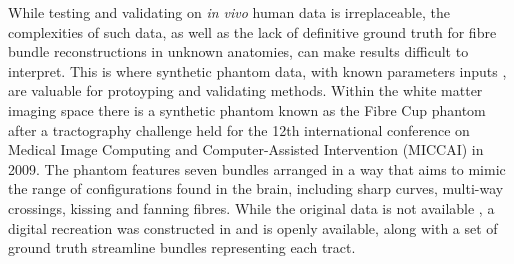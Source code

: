 
While testing and validating on \textit{in vivo} human data is irreplaceable, the complexities of such data, as well as the lack of definitive ground truth for fibre bundle reconstructions in unknown anatomies, can make results difficult to interpret.
This is where synthetic phantom data, with known parameters inputs , are valuable for protoyping and validating methods.
Within the white matter imaging space there is a synthetic phantom known as the Fibre Cup phantom after a tractography challenge held for the 12th international conference on Medical Image Computing and Computer-Assisted Intervention (MICCAI) in 2009.
The phantom features seven bundles arranged in a way that aims to mimic the range of configurations found in the brain, including sharp curves, multi-way crossings, kissing and fanning fibres.
While the original data is not available , a digital recreation was constructed in  and is openly available, along with a set of ground truth streamline bundles representing each tract. 

